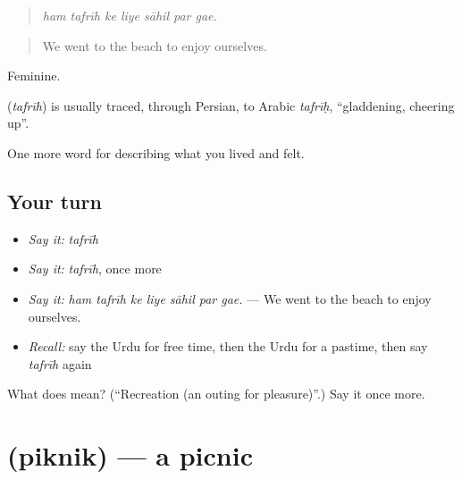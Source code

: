 \begin{quote}
      
\end{quote}

\begin{quote}
\emph{ham tafrīh ke liye sāhil par gae.}
\end{quote}

\begin{quote}
We went to the beach to enjoy ourselves.
\end{quote}

Feminine.

\begin{cousinweb}
\textbf{} (\emph{tafrīh}) is usually traced, through Persian, to Arabic \emph{tafrīḥ}, \textquotedblleft{}gladdening, cheering up\textquotedblright{}.
\end{cousinweb}

\begin{grammarlens}[title={What you've built}]
One more word for describing what you lived and felt.
\end{grammarlens}

\subsection*{Your turn}
\begin{itemize}
\raggedright
  \item \emph{Say it:} \emph{tafrīh}
  \item \emph{Say it:} \emph{tafrīh}, once more
  \item \emph{Say it:} \emph{ham tafrīh ke liye sāhil par gae.} — We went to the beach to enjoy ourselves.
  \item \emph{Recall:} say the Urdu for free time, then the Urdu for a pastime, then say \emph{tafrīh} again
\end{itemize}

\begin{tcolorbox}[breakable,colback=teal!4,colframe=teal!35!black,title={Before you move on}]
What does  mean? (\textquotedblleft{}Recreation (an outing for pleasure)\textquotedblright{}.) Say it once more.
\end{tcolorbox}
\section[\texorpdfstring{\ur{پکنک} (piknik)}{پکنک (piknik)}]{ (piknik) — a picnic}

